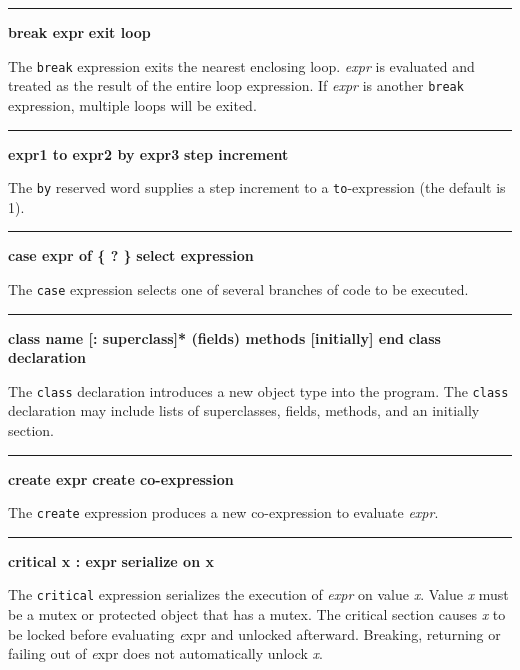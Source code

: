 \bigskip\hrule\vspace{0.1cm}
\noindent
{\bf break expr } \hfill {\bf exit loop}

\noindent
The \texttt{break} expression exits the nearest
enclosing loop. \textit{expr} is evaluated and treated as the result of
the entire loop expression. If \textit{expr} is another
\texttt{break} expression, multiple loops will be exited.

\bigskip\hrule\vspace{0.1cm}
\noindent
{\bf expr1 to expr2 by expr3 } \hfill {\bf step increment}

\noindent
{}The \texttt{by} reserved word supplies a step
increment to a \texttt{to}{}-expression (the default is 1).

\bigskip\hrule\vspace{0.1cm}
\noindent
{\bf case expr of \{ ? \} } \hfill {\bf select expression}

\noindent
The \texttt{case} expression selects one of
several branches of code to be executed.

\bigskip\hrule\vspace{0.1cm}
\noindent
{\bf \textbf{class} name [: superclass]* (fields) methods [initially] end } \hfill {\bf class declaration}

\noindent
{}The \texttt{class} declaration introduces a new
object type into the program. The \texttt{class} declaration may
include lists of superclasses, fields, methods, and an
initially section.

\bigskip\hrule\vspace{0.1cm}
\noindent
{\bf create expr } \hfill {\bf create co{}-expression}

\noindent
{}The \texttt{create} expression produces a new
co-expression to evaluate \textit{expr}.

\bigskip\hrule\vspace{0.1cm}
\noindent
{\bf critical x : expr } \hfill {\bf serialize on x}

\noindent
{}The \texttt{critical} expression serializes the
execution of \textit{expr} on value {\textit x}. Value {\textit x} must
be a mutex or protected object that has a mutex. The critical section
causes {\textit x} to be locked before evaluating {\textit expr} and
unlocked afterward. Breaking, returning or failing out of {\textit expr} 
does not automatically unlock {\textit x}.\WarningNotThreadSafe


